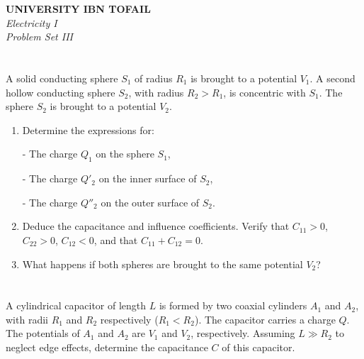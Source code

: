 \documentclass[12pt]{article}
\begin{document}
\begin{center}
	\Large\textbf{UNIVERSITY IBN TOFAIL} \\[1em]
	\large\textit{Electricity I} \\[2em]
	\large\textit{Problem Set III} \\[0.5em]
\end{center}

\vspace{1cm}

\section{}
A solid conducting sphere $ S_1 $ of radius $ R_1 $ is brought to a potential $ V_1 $. A second hollow conducting sphere $ S_2 $, with radius $ R_2 > R_1 $, is concentric with $ S_1 $. The sphere $ S_2 $ is brought to a potential $ V_2 $.
\begin{enumerate}
	\item Determine the expressions for:


	      - The charge $ Q_1 $ on the sphere $ S_1 $,

	      - The charge $ Q'_2 $ on the inner surface of $ S_2 $,

	      - The charge $ Q''_2 $ on the outer surface of $ S_2 $.

	\item Deduce the capacitance and influence coefficients. Verify that $ C_{11} > 0 $, $ C_{22} > 0 $, $ C_{12} < 0 $, and that $ C_{11} + C_{12} = 0 $.
	\item What happens if both spheres are brought to the same potential $ V_2 $?
\end{enumerate}


\begin{correctionbox}

\end{correctionbox}

\section{}
A cylindrical capacitor of length $ L $ is formed by two coaxial cylinders $ A_1 $ and $ A_2 $, with radii $ R_1 $ and $ R_2 $ respectively ($ R_1 < R_2 $). The capacitor carries a charge $ Q $. The potentials of $ A_1 $ and $ A_2 $ are $ V_1 $ and $ V_2 $, respectively. Assuming $ L \gg R_2 $ to neglect edge effects, determine the capacitance $ C $ of this capacitor.
\end{document}
